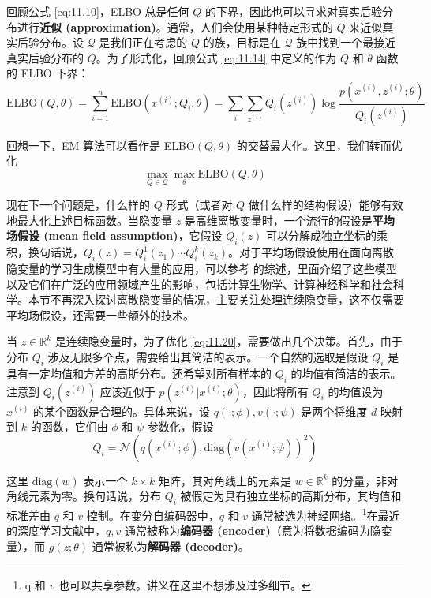 回顾公式 \eqref{eq:11.10}，ELBO 总是任何 $Q$ 的下界，因此也可以寻求对真实后验分布进行\textbf{近似 (approximation)}。通常，人们会使用某种特定形式的 $Q$ 来近似真实后验分布。设 $\mathcal{Q}$ 是我们正在考虑的 $Q$ 的族，目标是在 $\mathcal{Q}$ 族中找到一个最接近真实后验分布的 $Q$。为了形式化，回顾公式 \eqref{eq:11.14} 中定义的作为 $Q$ 和 $\theta$ 函数的 ELBO 下界：
\[
    \text{ELBO}(Q, \theta) = \sum_{i=1}^n \text{ELBO}(x^{(i)}; Q_i, \theta) = \sum_i \sum_{z^{(i)}} Q_i(z^{(i)}) \log \frac{p(x^{(i)}, z^{(i)}; \theta)}{Q_i(z^{(i)})}
\]

回想一下，EM 算法可以看作是 ELBO$(Q, \theta)$ 的交替最大化。这里，我们转而优化
\begin{equation}
    \max_{Q \in \mathcal{Q}} \max_\theta \text{ELBO}(Q, \theta) \label{eq:11.20}
\end{equation}

现在下一个问题是，什么样的 $Q$ 形式（或者对 $Q$ 做什么样的结构假设）能够有效地最大化上述目标函数。当隐变量 $z$ 是高维离散变量时，一个流行的假设是\textbf{平均场假设 (mean field assumption)}，它假设 $Q_i(z)$ 可以分解成独立坐标的乘积，换句话说，$Q_i(z) = Q_i^1(z_1) \cdots Q_i^k(z_k)$。对于平均场假设使用在面向离散隐变量的学习生成模型中有大量的应用，可以参考 \cite{blei2017variational} 的综述，里面介绍了这些模型以及它们在广泛的应用领域产生的影响，包括计算生物学、计算神经科学和社会科学。本节不再深入探讨离散隐变量的情况，主要关注处理连续隐变量，这不仅需要平均场假设，还需要一些额外的技术。

当 $z \in \mathbb{R}^k$ 是连续隐变量时，为了优化 \eqref{eq:11.20}，需要做出几个决策。首先，由于分布 $Q_i$ 涉及无限多个点，需要给出其简洁的表示。一个自然的选取是假设 $Q_i$ 是具有一定均值和方差的高斯分布。还希望对所有样本的 $Q_i$ 的均值有简洁的表示。注意到 $Q_i(z^{(i)})$ 应该近似于 $p(z^{(i)}|x^{(i)}; \theta)$，因此将所有 $Q_i$ 的均值设为 $x^{(i)}$ 的某个函数是合理的。具体来说，设 $q(\cdot; \phi), v(\cdot; \psi)$ 是两个将维度 $d$ 映射到 $k$ 的函数，它们由 $\phi$ 和 $\psi$ 参数化，假设
\begin{equation}
Q_i = \mathcal{N}(q(x^{(i)}; \phi), \text{diag}(v(x^{(i)}; \psi))^2) \label{eq:11.21}
\end{equation}

这里 $\text{diag}(w)$ 表示一个 $k \times k$ 矩阵，其对角线上的元素是 $w \in \mathbb{R}^k$ 的分量，非对角线元素为零。换句话说，分布 $Q_i$ 被假定为具有独立坐标的高斯分布，其均值和标准差由 $q$ 和 $v$ 控制。在变分自编码器中，$q$ 和 $v$ 通常被选为神经网络。\footnote{q 和 $v$ 也可以共享参数。讲义在这里不想涉及过多细节。}在最近的深度学习文献中，$q, v$ 通常被称为\textbf{编码器 (encoder)}（意为将数据编码为隐变量），而 $g(z; \theta)$ 通常被称为\textbf{解码器 (decoder)}。

